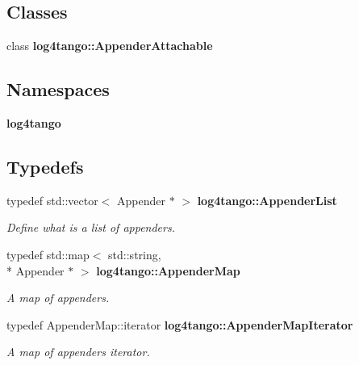 \subsection*{Classes}
\begin{DoxyCompactItemize}
\item 
class {\bf log4tango\-::\-Appender\-Attachable}
\end{DoxyCompactItemize}
\subsection*{Namespaces}
\begin{DoxyCompactItemize}
\item 
{\bf log4tango}
\end{DoxyCompactItemize}
\subsection*{Typedefs}
\begin{DoxyCompactItemize}
\item 
typedef std\-::vector$<$ Appender $\ast$ $>$ {\bf log4tango\-::\-Appender\-List}
\begin{DoxyCompactList}\small\item\em Define what is a list of appenders. \end{DoxyCompactList}\item 
typedef std\-::map$<$ std\-::string, \\*
Appender $\ast$ $>$ {\bf log4tango\-::\-Appender\-Map}
\begin{DoxyCompactList}\small\item\em A map of appenders. \end{DoxyCompactList}\item 
typedef Appender\-Map\-::iterator {\bf log4tango\-::\-Appender\-Map\-Iterator}
\begin{DoxyCompactList}\small\item\em A map of appenders iterator. \end{DoxyCompactList}\end{DoxyCompactItemize}
